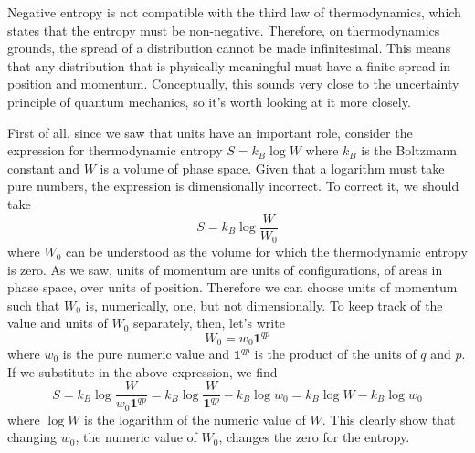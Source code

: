 Negative entropy is not compatible with the third law of thermodynamics, which states that the entropy must be non-negative. Therefore, on thermodynamics grounds, the spread of a distribution cannot be made infinitesimal. This means that any distribution that is physically meaningful must have a finite spread in position and momentum. Conceptually, this sounds very close to the uncertainty principle of quantum mechanics, so it's worth looking at it more closely.

First of all, since we saw that units have an important role, consider the expression for thermodynamic entropy $S=k_B \log W$ where $k_B$ is the Boltzmann constant and $W$ is a volume of phase space. Given that a logarithm must take pure numbers, the expression is dimensionally incorrect. To correct it, we should take
\begin{equation}
	S = k_B \log \frac{W}{W_0}
\end{equation}
where $W_0$ can be understood as the volume for which the thermodynamic entropy is zero. As we saw, units of momentum are units of configurations, of areas in phase space, over units of position. Therefore we can choose units of momentum such that $W_0$ is, numerically, one, but not dimensionally. To keep track of the value and units of $W_0$ separately, then, let's write
\begin{equation}
	W_0 = w_0 \textbf{1}^{qp}
\end{equation}
where $w_0$ is the pure numeric value and $\textbf{1}^{qp}$ is the product of the units of $q$ and $p$. If we substitute in the above expression, we find
\begin{equation}
	S = k_B \log \frac{W}{w_0 \textbf{1}^{qp}} = k_B \log \frac{W}{\textbf{1}^{qp}} - k_B \log w_0 = k_B \log W - k_B \log w_0
\end{equation}
where $\log W$ is the logarithm of the numeric value of $W$. This clearly show that changing $w_0$, the numeric value of $W_0$, changes the zero for the entropy.

